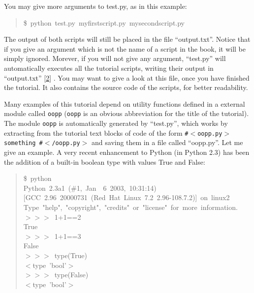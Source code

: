 \documentclass[11pt,english]{book}
\begin{document}
You may give more arguments to test.py, as in this example:
\begin{quote}
\begin{ttfamily}\begin{flushleft}
\mbox{{\$}~python~test.py~myfirstscript.py~mysecondscript.py}
\end{flushleft}\end{ttfamily}
\end{quote}

The output of both scripts will still be placed in the file ``output.txt''.
Notice that if you give an argument which is not the name of a script in the
book, it will be simply ignored. Morever, if you will not give any argument,
``test.py'' will automatically executes all the tutorial scripts, writing their 
output in ``output.txt'' [\hyperlink{id4}{2}] . You may want to give a look at this file, once 
you have finished the tutorial. It also contains the source code of 
the scripts, for better readability.

Many examples of this tutorial depend on utility functions defined
in a external module called \texttt{oopp} (\texttt{oopp} is an obvious abbreviation 
for the title of the tutorial). The module \texttt{oopp} is automatically generated 
by ``test.py'', which works by extracting from the tutorial 
text blocks of code of the form \texttt{{\#}{$<$}oopp.py{$>$} something {\#}{$<$}/oopp.py{$>$}} 
and saving them in a file called ``oopp.py''. 
Let me give an example. A very recent enhancement to Python (in 
Python 2.3) has been the addition of a built-in boolean type with
values True and False:
\begin{quote}
\begin{ttfamily}\begin{flushleft}
\mbox{{\$}~python}\\
\mbox{Python~2.3a1~({\#}1,~Jan~~6~2003,~10:31:14)}\\
\mbox{[GCC~2.96~20000731~(Red~Hat~Linux~7.2~2.96-108.7.2)]~on~linux2}\\
\mbox{Type~"help",~"copyright",~"credits"~or~"license"~for~more~information.}\\
\mbox{{$>$}{$>$}{$>$}~1+1==2}\\
\mbox{True}\\
\mbox{{$>$}{$>$}{$>$}~1+1==3}\\
\mbox{False}\\
\mbox{{$>$}{$>$}{$>$}~type(True)}\\
\mbox{{$<$}type~'bool'{$>$}}\\
\mbox{{$>$}{$>$}{$>$}~type(False)}\\
\mbox{{$<$}type~'bool'{$>$}}
\end{flushleft}\end{ttfamily}
\end{quote}
\end{document}
